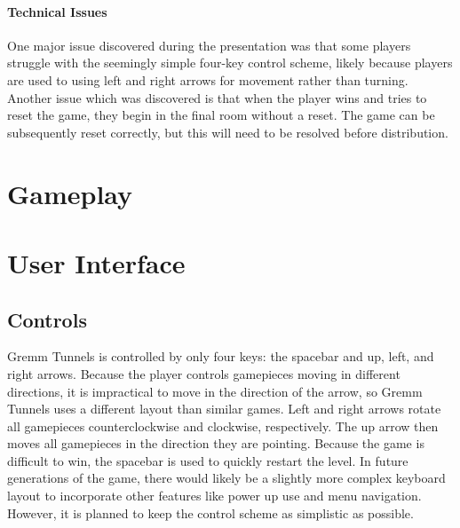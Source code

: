 \documentclass{scrreprt}
\begin{document}
				\subsubsection{Technical Issues}
					One major issue discovered during the presentation was that some players struggle with the seemingly simple four-key control scheme, likely because players are used to using left and right arrows for movement rather than turning. Another issue which was discovered is that when the player wins and tries to reset the game, they begin in the final room without a reset. The game can be subsequently reset correctly, but this will need to be resolved before distribution.								
	
	\chapter{Gameplay}
	
	\chapter{User Interface}
		
		\section{Controls}
			Gremm Tunnels is controlled by only four keys: the spacebar and up, left, and right arrows. Because the player controls gamepieces moving in different directions, it is impractical to move in the direction of the arrow, so Gremm Tunnels uses a different layout than similar games. Left and right arrows rotate all gamepieces counterclockwise and clockwise, respectively. The up arrow then moves all gamepieces in the direction they are pointing. Because the game is difficult to win, the spacebar is used to quickly restart the level. In future generations of the game, there would likely be a slightly more complex keyboard layout to incorporate other features like power up use and menu navigation. However, it is planned to keep the control scheme as simplistic as possible. 
		
\end{document}
